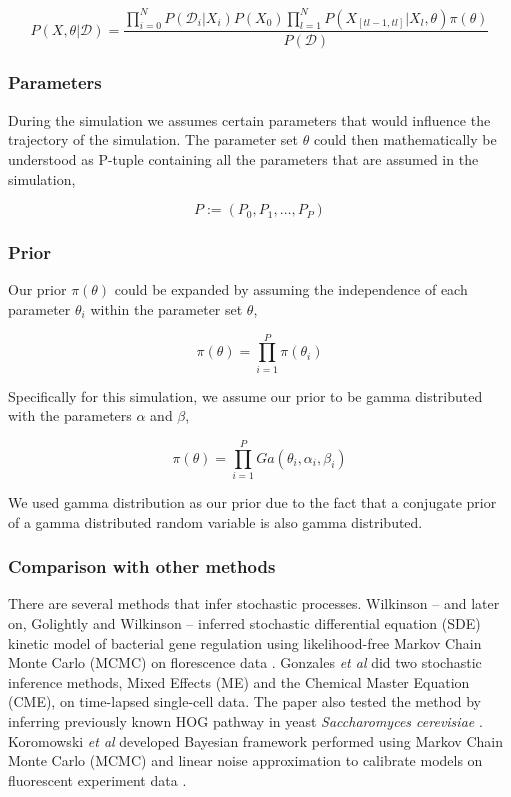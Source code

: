 \documentclass{bioinfo}
\begin{document}
\begin{equation}
P(X, \theta | \mathcal{D}) = \frac{\prod_{i=0}^{N} P(\mathcal{D}_i | X_i) P(X_0) \prod_{l=1}^{N} P(X_{[tl-1, tl]} | X_l, \theta)\pi(\theta)}{P(\mathcal{D})}\label{eq:07}
\end{equation}

\subsubsection{Parameters}

During the simulation we assumes certain parameters that would influence the trajectory of the simulation. The parameter set $\theta$ could then mathematically be understood as P-tuple containing all the parameters that are assumed in the simulation,

\begin{equation}
P := (P_0, P_1, \dots , P_P)\label{eq:08}
\end{equation}

\subsubsection{Prior}

Our prior $\pi(\theta)$ could be expanded by assuming the independence of each parameter $\theta_i$ within the parameter set $\theta$,

\begin{equation}
\pi(\theta) = \prod_{i=1}^{P} \pi(\theta_i)\label{eq:09}
\end{equation}

Specifically for this simulation, we assume our prior to be gamma distributed with the parameters $\alpha$ and $\beta$,

\begin{equation}
\pi(\theta) = \prod_{i=1}^{P} Ga(\theta_i, \alpha_i, \beta_i)\label{eq:10}
\end{equation}

We used gamma distribution as our prior due to the fact that a conjugate prior of a gamma distributed random variable is also gamma distributed.

\subsubsection{Comparison with other methods}

There are several methods that infer stochastic processes. Wilkinson -- and later on, Golightly and Wilkinson --  inferred stochastic differential equation (SDE) kinetic model of bacterial gene regulation using likelihood-free Markov Chain Monte Carlo (MCMC) on florescence data \citep{Wilkinson10, GolightlyWilkinson10}. Gonzales \textit{et al} did two stochastic inference methods, Mixed Effects (ME) and the Chemical Master Equation (CME), on time-lapsed single-cell data. The paper also tested the method by inferring previously known HOG pathway in yeast \textit{Saccharomyces cerevisiae} \citep{Gonzales13}. Koromowski \textit{et al} developed Bayesian framework performed using Markov Chain Monte Carlo (MCMC) and linear noise approximation to calibrate models on fluorescent experiment data \citep{Komorowski09}.
\end{document}

